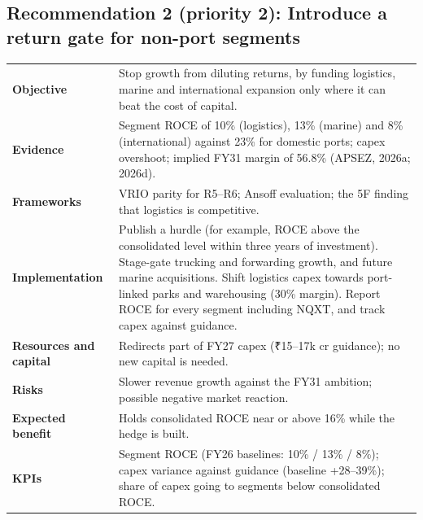 \documentclass[12pt, a4paper]{article}
\newcommand{\tablesetup}{\footnotesize\renewcommand{\arraystretch}{1.25}\setlength{\tabcolsep}{4pt}}
\newcommand{\rowsep}{\addlinespace[3pt]}
\newcommand{\reclabel}[1]{\textbf{#1}}
\begin{document}
\subsection{Recommendation 2 (priority 2): Introduce a return gate for non-port segments}
\begingroup\tablesetup
\begin{xltabular}{\linewidth}{P{30mm}L}
\toprule
\reclabel{Objective} & Stop growth from diluting returns, by funding logistics, marine and international expansion only where it can beat the cost of capital. \\ \rowsep
\reclabel{Evidence} & Segment ROCE of 10\% (logistics), 13\% (marine) and 8\% (international) against 23\% for domestic ports; capex overshoot; implied FY31 margin of 56.8\% (APSEZ, 2026a; 2026d). \\ \rowsep
\reclabel{Frameworks} & VRIO parity for R5--R6; Ansoff evaluation; the 5F finding that logistics is competitive. \\ \rowsep
\reclabel{Implementation} & Publish a hurdle (for example, ROCE above the consolidated level within three years of investment). Stage-gate trucking and forwarding growth, and future marine acquisitions. Shift logistics capex towards port-linked parks and warehousing (30\% margin). Report ROCE for every segment including NQXT, and track capex against guidance. \\ \rowsep
\reclabel{Resources and capital} & Redirects part of FY27 capex (₹15--17k cr guidance); no new capital is needed. \\ \rowsep
\reclabel{Risks} & Slower revenue growth against the FY31 ambition; possible negative market reaction. \\ \rowsep
\reclabel{Expected benefit} & Holds consolidated ROCE near or above 16\% while the hedge is built. \\ \rowsep
\reclabel{KPIs} & Segment ROCE (FY26 baselines: 10\% / 13\% / 8\%); capex variance against guidance (baseline +28--39\%); share of capex going to segments below consolidated ROCE. \\
\bottomrule
\end{xltabular}
\endgroup

\end{document}
